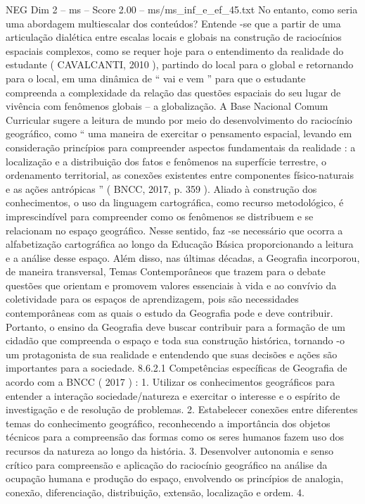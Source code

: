 \begin{textsample}{NEG Dim 2 – ms – Score 2.00 – ms/ms\_inf\_e\_ef\_45.txt}
No entanto, como seria uma abordagem multiescalar dos conteúdos?
Entende -se que a partir de uma articulação dialética entre escalas locais e globais na construção de raciocínios espaciais complexos, como se requer hoje para o entendimento da realidade do estudante ( CAVALCANTI, 2010 ), partindo do local para o global e retornando para o local, em uma dinâmica de “ vai e vem ” para que o estudante compreenda a complexidade da relação das questões espaciais do seu lugar de vivência com fenômenos globais – a globalização.
A Base Nacional Comum Curricular sugere a leitura de mundo por meio do desenvolvimento do raciocínio geográfico, como “ uma maneira de exercitar o pensamento espacial, levando em consideração princípios para compreender aspectos fundamentais da realidade : a localização e a distribuição dos fatos e fenômenos na superfície terrestre, o ordenamento territorial, as conexões existentes entre componentes físico-naturais e as ações antrópicas ” ( BNCC, 2017, p. 359 ).
Aliado à construção dos conhecimentos, o uso da linguagem cartográfica, como recurso metodológico, é imprescindível para compreender como os fenômenos se distribuem e se relacionam no espaço geográfico.
Nesse sentido, faz -se necessário que ocorra a alfabetização cartográfica ao longo da Educação Básica proporcionando a leitura e a análise desse espaço.
Além disso, nas últimas décadas, a Geografia incorporou, de maneira transversal, Temas Contemporâneos que trazem para o debate questões que orientam e promovem valores essenciais à vida e ao convívio da coletividade para os espaços de aprendizagem, pois são necessidades contemporâneas com as quais o estudo da Geografia pode e deve contribuir.
Portanto, o ensino da Geografia deve buscar contribuir para a formação de um cidadão que compreenda o espaço e toda sua construção histórica, tornando -o um protagonista de sua realidade e entendendo que suas decisões e ações são importantes para a sociedade. 8.6.2.1 Competências específicas de Geografia de acordo com a BNCC ( 2017 ) : 1.
Utilizar os conhecimentos geográficos para entender a interação sociedade/natureza e exercitar o interesse e o espírito de investigação e de resolução de problemas. 2.
Estabelecer conexões entre diferentes temas do conhecimento geográfico, reconhecendo a importância dos objetos técnicos para a compreensão das formas como os seres humanos fazem uso dos recursos da natureza ao longo da história. 3.
Desenvolver autonomia e senso crítico para compreensão e aplicação do raciocínio geográfico na análise da ocupação humana e produção do espaço, envolvendo os princípios de analogia, conexão, diferenciação, distribuição, extensão, localização e ordem. 4.

\end{textsample}
